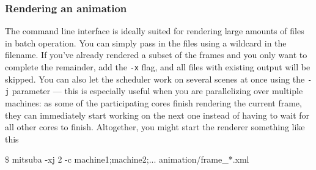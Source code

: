 \subsubsection{Rendering an animation}
The command line interface is ideally suited for rendering large amounts of files in batch
operation. You can simply pass in the files using a wildcard in the filename. If you've
already rendered a subset of the frames and you only want to complete the remainder, add the
\texttt{-x} flag, and all files with existing output will be skipped. You can also 
let the scheduler work on several scenes at once using the \texttt{-j} parameter --- this is 
especially useful when you are 
parallelizing over multiple machines: as some of the participating cores 
finish rendering the current frame, they can immediately start working on the next one
instead of having to wait for all other cores to finish. Altogether, you
might start the renderer something like this
\begin{shell}
$\texttt{\$}$ mitsuba -xj 2 -c machine1;machine2;...  animation/frame_*.xml
\end{shell}


